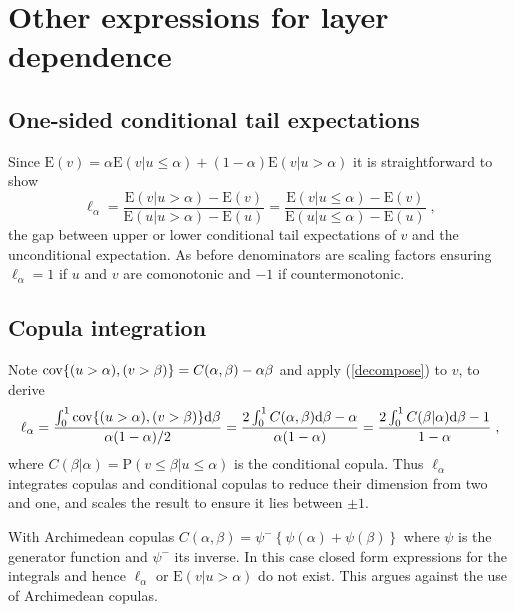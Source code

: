 \documentclass[authoryear]{elsarticle}
\newcommand{\cov}{{\rm cov}}
\newcommand{\E}{{\mathrm E}}
\newcommand{\de}{\mathrm{d}}
\newcommand{\p}{\mathrm{P}}
\newcommand{\eref}[1]{(\ref{#1})}
\begin{document}
\section{Other expressions for layer dependence}\label{sotherexp}


\subsection{One-sided conditional tail expectations}


Since $\E(v)=\alpha\E(v|u\leq \alpha)+(1-\alpha)\E(v|u>\alpha)$ it is straightforward to show
$$
\ell_\alpha = \frac{\E(v|u> \alpha)-\E(v)}{\E(u|u> \alpha)-\E(u)} = \frac{\E(v|u\leq \alpha)-\E(v)}{\E(u|u\leq \alpha)-\E(u)} \;,
$$
the gap between upper or lower conditional tail expectations of $v$ and the unconditional expectation. As before denominators are scaling factors ensuring $\ell_\alpha=1$ if $u$ and $v$ are comonotonic and $-1$ if countermonotonic.

\subsection{Copula integration}

Note $\cov\{(u>\alpha),(v>\beta)\}=C(\alpha,\beta)-\alpha\beta$ and apply \eref{decompose} to $v$, to derive
$$
\ell_\alpha = \frac{\int_0^1 \cov\{(u>\alpha),(v>\beta)\} \de\beta }{\alpha(1-\alpha)/2}
= \frac{2 \int_0^1 C(\alpha,\beta) \de \beta- \alpha}{\alpha(1-\alpha)} = \frac{2 \int_0^1 C(\beta|\alpha) \de \beta- 1}{1-\alpha}\;,
$$
where $C(\beta|\alpha)=\p(v\le\beta|u\le\alpha)$ is the conditional copula. Thus $\ell_\alpha$ integrates copulas and conditional copulas to reduce their dimension from two and one, and scales the result to ensure it lies between $\pm 1$.

With Archimedean copulas \citep{mcneil2005qrm} $C(\alpha,\beta) =\psi^-\left\{\psi(\alpha)+\psi(\beta)\right\}$ where $\psi$ is the generator function and $\psi^-$ its inverse. In this case closed form expressions for the integrals and hence $\ell_\alpha$ or $\E(v|u>\alpha)$  do not exist. This  argues against the use of Archimedean copulas.
\end{document}
